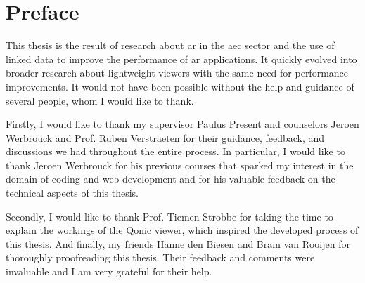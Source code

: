\chapter*{Preface}
This thesis is the result of research about \ac{ar} in the \ac{aec} sector and the use of linked data to improve the performance of \ac{ar} applications. It quickly evolved into broader research about lightweight viewers with the same need for performance improvements. It would not have been possible without the help and guidance of several people, whom I would like to thank.

Firstly, I would like to thank my supervisor Paulus Present and counselors Jeroen Werbrouck and Prof. Ruben Verstraeten for their guidance, feedback, and discussions we had throughout the entire process. In particular, I would like to thank Jeroen Werbrouck for his previous courses that sparked my interest in the domain of coding and web development and for his valuable feedback on the technical aspects of this thesis.

Secondly, I would like to thank Prof. Tiemen Strobbe for taking the time to explain the workings of the Qonic viewer, which inspired the developed process of this thesis. And finally, my friends Hanne den Biesen and Bram van Rooijen for thoroughly proofreading this thesis. Their feedback and comments were invaluable and I am very grateful for their help.